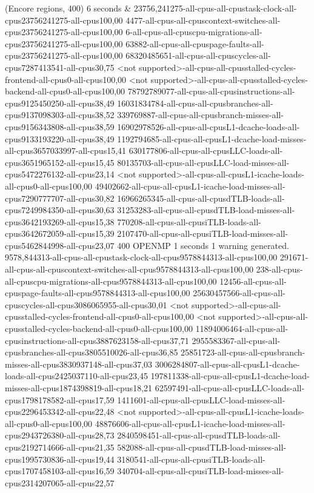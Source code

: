 (Encore regions, 400) 6 seconds
&
23756,241275-all-cpus-all-cpustask-clock-all-cpus23756241275-all-cpus100,00
4477-all-cpus-all-cpuscontext-switches-all-cpus23756241275-all-cpus100,00
6-all-cpus-all-cpuscpu-migrations-all-cpus23756241275-all-cpus100,00
63882-all-cpus-all-cpuspage-faults-all-cpus23756241275-all-cpus100,00
68320485651-all-cpus-all-cpuscycles-all-cpus7287413541-all-cpus30,75
<not supported>-all-cpus-all-cpusstalled-cycles-frontend-all-cpus0-all-cpus100,00
<not supported>-all-cpus-all-cpusstalled-cycles-backend-all-cpus0-all-cpus100,00
78792789077-all-cpus-all-cpusinstructions-all-cpus9125450250-all-cpus38,49
16031834784-all-cpus-all-cpusbranches-all-cpus9137098303-all-cpus38,52
339769887-all-cpus-all-cpusbranch-misses-all-cpus9156343808-all-cpus38,59
16902978526-all-cpus-all-cpusL1-dcache-loads-all-cpus9133193220-all-cpus38,49
1192794685-all-cpus-all-cpusL1-dcache-load-misses-all-cpus3657033997-all-cpus15,41
630177806-all-cpus-all-cpusLLC-loads-all-cpus3651965152-all-cpus15,45
80135703-all-cpus-all-cpusLLC-load-misses-all-cpus5472276132-all-cpus23,14
<not supported>-all-cpus-all-cpusL1-icache-loads-all-cpus0-all-cpus100,00
49402662-all-cpus-all-cpusL1-icache-load-misses-all-cpus7290777707-all-cpus30,82
16966265345-all-cpus-all-cpusdTLB-loads-all-cpus7249984350-all-cpus30,63
31253283-all-cpus-all-cpusdTLB-load-misses-all-cpus3642193269-all-cpus15,38
770208-all-cpus-all-cpusiTLB-loads-all-cpus3642672059-all-cpus15,39
2107470-all-cpus-all-cpusiTLB-load-misses-all-cpus5462844998-all-cpus23,07
400 OPENMP 1 seconds
1 warning generated.
9578,844313-all-cpus-all-cpustask-clock-all-cpus9578844313-all-cpus100,00
291671-all-cpus-all-cpuscontext-switches-all-cpus9578844313-all-cpus100,00
238-all-cpus-all-cpuscpu-migrations-all-cpus9578844313-all-cpus100,00
12456-all-cpus-all-cpuspage-faults-all-cpus9578844313-all-cpus100,00
25630457566-all-cpus-all-cpuscycles-all-cpus3086065955-all-cpus30,01
<not supported>-all-cpus-all-cpusstalled-cycles-frontend-all-cpus0-all-cpus100,00
<not supported>-all-cpus-all-cpusstalled-cycles-backend-all-cpus0-all-cpus100,00
11894006464-all-cpus-all-cpusinstructions-all-cpus3887623158-all-cpus37,71
2955583367-all-cpus-all-cpusbranches-all-cpus3805510026-all-cpus36,85
25851723-all-cpus-all-cpusbranch-misses-all-cpus3830937148-all-cpus37,03
3006284807-all-cpus-all-cpusL1-dcache-loads-all-cpus2425037110-all-cpus23,45
197811338-all-cpus-all-cpusL1-dcache-load-misses-all-cpus1874398819-all-cpus18,21
62597491-all-cpus-all-cpusLLC-loads-all-cpus1798178582-all-cpus17,59
1411601-all-cpus-all-cpusLLC-load-misses-all-cpus2296453342-all-cpus22,48
<not supported>-all-cpus-all-cpusL1-icache-loads-all-cpus0-all-cpus100,00
48876606-all-cpus-all-cpusL1-icache-load-misses-all-cpus2943726380-all-cpus28,73
2840598451-all-cpus-all-cpusdTLB-loads-all-cpus2192714666-all-cpus21,35
582088-all-cpus-all-cpusdTLB-load-misses-all-cpus1995730836-all-cpus19,44
3180541-all-cpus-all-cpusiTLB-loads-all-cpus1707458103-all-cpus16,59
340704-all-cpus-all-cpusiTLB-load-misses-all-cpus2314207065-all-cpus22,57
